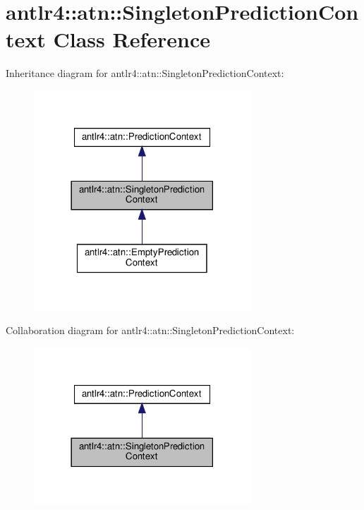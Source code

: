 \hypertarget{classantlr4_1_1atn_1_1SingletonPredictionContext}{}\section{antlr4\+:\+:atn\+:\+:Singleton\+Prediction\+Context Class Reference}
\label{classantlr4_1_1atn_1_1SingletonPredictionContext}


Inheritance diagram for antlr4\+:\+:atn\+:\+:Singleton\+Prediction\+Context\+:
\nopagebreak
\begin{figure}[H]
\begin{center}
\leavevmode
\includegraphics[width=230pt]{classantlr4_1_1atn_1_1SingletonPredictionContext__inherit__graph}
\end{center}
\end{figure}


Collaboration diagram for antlr4\+:\+:atn\+:\+:Singleton\+Prediction\+Context\+:
\nopagebreak
\begin{figure}[H]
\begin{center}
\leavevmode
\includegraphics[width=230pt]{classantlr4_1_1atn_1_1SingletonPredictionContext__coll__graph}
\end{center}
\end{figure}
